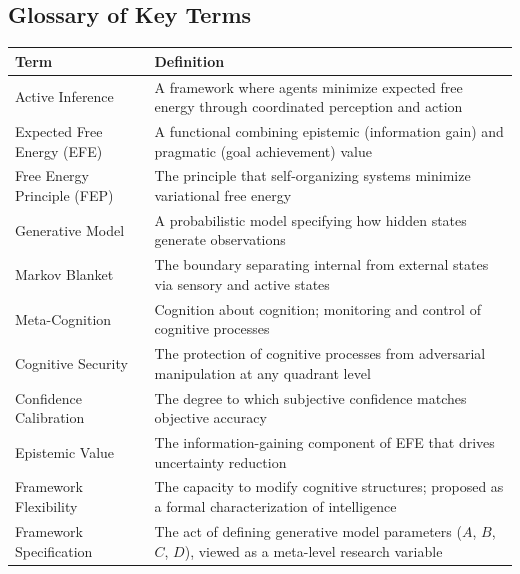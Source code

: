 \documentclass[
]{article}
\newcounter{none} %
\begin{document}
\subsection{Glossary of Key Terms}\label{glossary-of-key-terms}

{\def\LTcaptype{none} %
\begin{longtable}[]{@{}
  >{\raggedright\arraybackslash}p{}
  >{\raggedright\arraybackslash}p{}@{}}
\toprule\noalign{}
\begin{minipage}[b]{\linewidth}\raggedright
Term
\end{minipage} & \begin{minipage}[b]{\linewidth}\raggedright
Definition
\end{minipage} \\
\midrule\noalign{}
\endhead
\bottomrule\noalign{}
\endlastfoot
Active Inference & A framework where agents minimize expected free
energy through coordinated perception and action \\
Expected Free Energy (EFE) & A functional combining epistemic
(information gain) and pragmatic (goal achievement) value \\
Free Energy Principle (FEP) & The principle that self-organizing systems
minimize variational free energy \\
Generative Model & A probabilistic model specifying how hidden states
generate observations \\
Markov Blanket & The boundary separating internal from external states
via sensory and active states \\
Meta-Cognition & Cognition about cognition; monitoring and control of
cognitive processes \\
Cognitive Security & The protection of cognitive processes from
adversarial manipulation at any quadrant level \\
Confidence Calibration & The degree to which subjective confidence
matches objective accuracy \\
Epistemic Value & The information-gaining component of EFE that drives
uncertainty reduction \\
Framework Flexibility & The capacity to modify cognitive structures;
proposed as a formal characterization of intelligence \\
Framework Specification & The act of defining generative model
parameters (\(A\), \(B\), \(C\), \(D\)), viewed as a meta-level research
variable \\

\end{longtable}}
\end{document}

